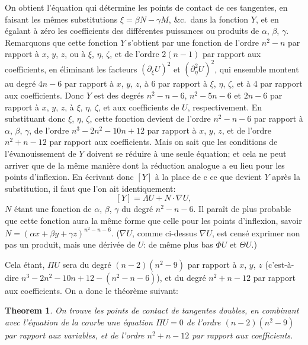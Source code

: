 \documentclass[11pt,a4paper]{book}
\newtheorem*{theorem}{Theorem}
\begin{document}
On obtient l'\'{e}quation qui d\'{e}termine les points de contact de ces tangentes, en
faisant les m\^{e}mes substitutions $\xi = \beta N - \gamma M$, \&c.\ dans la fonction $Y$,
et en \'{e}galant \`{a} z\'{e}ro les coefficients des diff\'{e}rentes puissances ou produits de
$\alpha$, $\beta$, $\gamma$. Remarquons que cette fonction $Y$ s'obtient par une fonction de
l'ordre $n^2 - n$ par rapport \`{a} $x$, $y$, $z$, ou \`{a} $\xi$, $\eta$, $\zeta$, et de l'ordre
$2(n-1)$ par rapport aux coefficients, en \'{e}liminant les facteurs $(\partial_\xi U)^2$ et
$(\partial_\eta^2 U)^2$, qui ensemble montent au degr\'{e} $4n-6$ par rapport \`{a} $x$, $y$, $z$,
\`{a} 6 par rapport \`{a} $\xi$, $\eta$, $\zeta$, et \`{a} 4 par rapport aux coefficients.
Donc $Y$ est des degr\'{e}s $n^2 - n - 6$, $n^2 - 5n - 6$ et $2n - 6$ par rapport
\`{a} $x$, $y$, $z$, \`{a} $\xi$, $\eta$, $\zeta$, et aux coefficients de $U$, respectivement.
En substituant donc $\xi$, $\eta$, $\zeta$, cette fonction devient de l'ordre $n^2 - n - 6$
par rapport \`{a} $\alpha$, $\beta$, $\gamma$, de l'ordre $n^3 - 2n^2 - 10n + 12$ par rapport
\`{a} $x$, $y$, $z$, et de l'ordre $n^2 + n - 12$ par rapport aux coefficients.
Mais on sait que les conditions de l'\'{e}vanouissement de $Y$ doivent se r\'{e}duire \`{a}
une seule \'{e}quation; et cela ne peut arriver que de la m\^{e}me mani\`{e}re dont la r\'{e}duction
analogue a eu lieu pour les points d'inflexion. En \'{e}crivant donc $[Y]$ \`{a} la place de
c ce que devient $Y$ apr\`{e}s la substitution, il faut que l'on ait identiquement:
\[
[Y] = \Lambda U + N \cdot \nabla U,
\]
$N$ \'{e}tant une fonction de $\alpha$, $\beta$, $\gamma$ du degr\'{e} $n^2 - n - 6$.
Il para\^{i}t de plus probable que cette fonction aura la m\^{e}me forme que celle pour
les points d'inflexion, savoir $N = (\alpha x + \beta y + \gamma z)^{n^2-n-6}$.
($\nabla U$, comme ci-dessus $\nabla U$, est cens\'{e} exprimer non pas un produit, mais une
d\'{e}riv\'{e}e de $U$: de m\^{e}me plus bas $\Phi U$ et $\Theta U$.)


Cela \'{e}tant, $\Pi U$ sera du degr\'{e} $(n-2)(n^2-9)$ par rapport \`{a} $x$, $y$, $z$
(c'est-\`{a}-dire $n^3 - 2n^2 - 10n + 12 - (n^2 - n - 6)$), et du degr\'{e}
$n^2 + n - 12$ par rapport aux coefficients.
On a donc le th\'{e}or\`{e}me suivant:

\begin{theorem}
On trouve les points de contact de tangentes doubles, en combinant avec l'\'{e}quation
de la courbe une \'{e}quation $\Pi U = 0$ de l'ordre $(n-2)(n^2-9)$ par rapport
aux variables, et de l'ordre $n^2 + n - 12$ par rapport aux coefficients.
\end{theorem}
\end{document}
